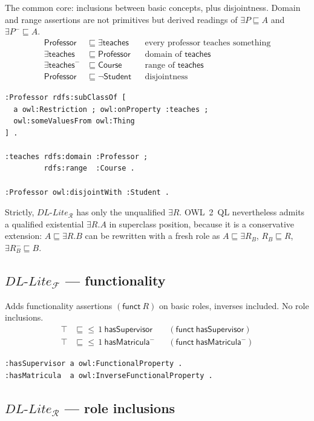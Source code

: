 \documentclass[11pt,a4paper]{article}
\newcommand{\dllite}[1]{\ensuremath{\textit{DL-Lite}_{#1}}}
\newcommand{\cn}[1]{\mathsf{#1}}      %
\newcommand{\rn}[1]{\mathsf{#1}}      %
\newcommand{\sub}{\sqsubseteq}
\newcommand{\inv}[1]{#1^{-}}
\begin{document}
The common core: inclusions between basic concepts, plus disjointness.
Domain and range assertions are not primitives but derived readings of
$\exists P \sub A$ and $\exists \inv{P} \sub A$.
\begin{align*}
  \cn{Professor} &\sub \exists \rn{teaches}
    &&\text{every professor teaches something}\\
  \exists \rn{teaches} &\sub \cn{Professor}
    &&\text{domain of } \rn{teaches}\\
  \exists \inv{\rn{teaches}} &\sub \cn{Course}
    &&\text{range of } \rn{teaches}\\
  \cn{Professor} &\sub \neg\cn{Student}
    &&\text{disjointness}
\end{align*}
\begin{lstlisting}
:Professor rdfs:subClassOf [
  a owl:Restriction ; owl:onProperty :teaches ;
  owl:someValuesFrom owl:Thing
] .

:teaches rdfs:domain :Professor ;
         rdfs:range  :Course .

:Professor owl:disjointWith :Student .
\end{lstlisting}

\noindent
Strictly, $\dllite{\mathcal{R}}$ has only the unqualified $\exists R$. OWL~2~QL
nevertheless admits a qualified existential $\exists R.A$ in superclass
position, because it is a conservative extension: $A \sub \exists R.B$ can be
rewritten with a fresh role as
$A \sub \exists R_B$, $R_B \sub R$, $\exists \inv{R_B} \sub B$.

\subsection*{$\dllite{\mathcal{F}}$ --- functionality}

Adds functionality assertions $(\mathsf{funct}\ R)$ on basic roles, inverses
included. No role inclusions.
\begin{align*}
  \top &\sub {\leq}\,1\ \rn{hasSupervisor}
    &&(\mathsf{funct}\ \rn{hasSupervisor})\\
  \top &\sub {\leq}\,1\ \inv{\rn{hasMatricula}}
    &&(\mathsf{funct}\ \inv{\rn{hasMatricula}})
\end{align*}
\begin{lstlisting}
:hasSupervisor a owl:FunctionalProperty .
:hasMatricula  a owl:InverseFunctionalProperty .
\end{lstlisting}

\subsection*{$\dllite{\mathcal{R}}$ --- role inclusions}
\end{document}
